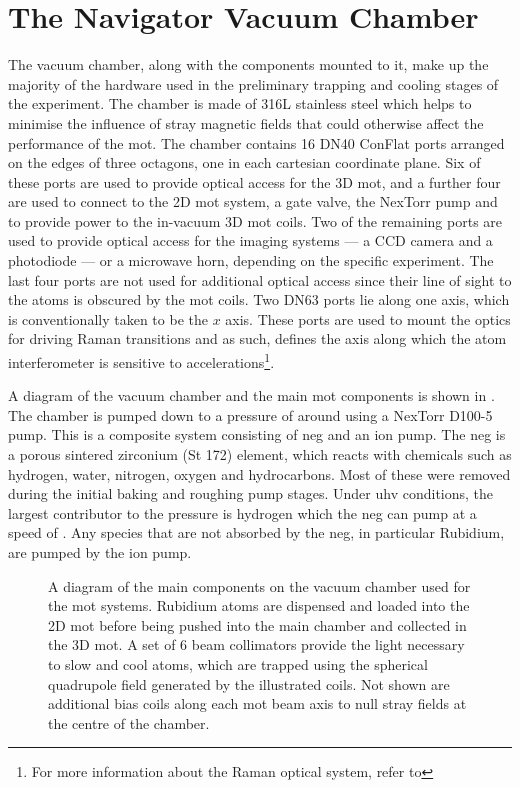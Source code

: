 \section{The Navigator Vacuum Chamber}\label{sec:vacuum_chamber}
The vacuum chamber, along with the components mounted to it, make up the
majority of the hardware used in the preliminary trapping and cooling stages of
the experiment. The chamber is made of 316L stainless steel which helps to
minimise the influence of stray magnetic fields that could otherwise affect the
performance of the \ac{mot}. The chamber contains 16 DN40 ConFlat ports arranged
on the edges of three octagons, one in each cartesian coordinate plane. Six of
these ports are used to provide optical access for the 3D \ac{mot}, and a
further four are used to connect to the 2D \ac{mot} system, a gate valve, the
NexTorr pump and to provide power to the in-vacuum 3D \ac{mot} coils. Two of the
remaining ports are used to provide optical access for the imaging systems --- a
CCD camera and a photodiode --- or a microwave horn, depending on the specific
experiment. The last four ports are not used for additional optical access since
their line of sight to the atoms is obscured by the \ac{mot} coils. Two DN63
ports lie along one axis, which is conventionally taken to be the \(x\) axis.
These ports are used to mount the optics for driving Raman transitions and as
such, defines the axis along which the atom interferometer is sensitive to
accelerations\footnote{For more information about the Raman optical system,
	refer to }. \par\noindent A diagram of the
vacuum chamber and the main \ac{mot} components is shown in
. The chamber is pumped down to a pressure of around
\sivalue{}{\milli\bar} using a NexTorr D100-5 pump. This is a
composite system consisting of \ac{neg} and an ion pump. The \ac{neg} is a
porous sintered zirconium (St 172) element, which reacts with chemicals such as
hydrogen, water, nitrogen, oxygen and hydrocarbons. Most of these were removed
during the initial baking and roughing pump stages. Under \ac{uhv} conditions,
the largest contributor to the pressure is hydrogen which the \ac{neg} can pump
at a speed of . Any species that are not
absorbed by the \ac{neg}, in particular Rubidium, are pumped by the
 ion pump.
\begin{figure}
	\centering
	\def\svgwidth{1\textwidth}
	
	\caption[\ac{mot} system component diagram]{A diagram of the main components on the vacuum chamber used for the \ac{mot}
		systems. Rubidium atoms are dispensed and loaded into the 2D \ac{mot}
		before being pushed into the main chamber and collected in the 3D
		\ac{mot}. A set of 6 beam collimators provide the light necessary to
		slow and cool atoms, which are trapped using the spherical quadrupole
		field generated by the illustrated coils. Not shown are additional bias
		coils along each \ac{mot} beam axis to null stray fields at the centre
		of the chamber.}
	\label{fig:mot_system}
\end{figure}
